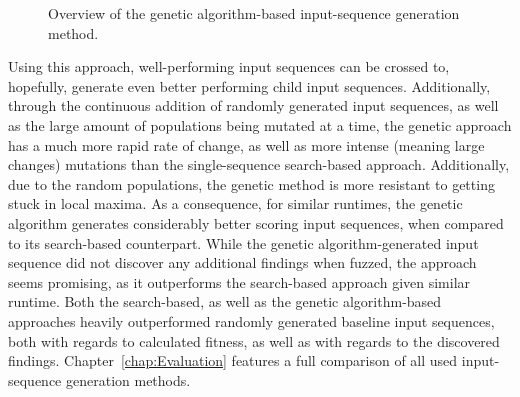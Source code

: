 \begin{figure}
	\begin{centering}
\caption{Overview of the genetic algorithm-based input-sequence generation method.}
\label{fig:fuzz_genetic}
\end{centering}
\end{figure}

Using this approach, well-performing input sequences can be crossed to, hopefully, generate even better performing child input sequences. Additionally, through the continuous addition of randomly generated input sequences, as well as the large amount of populations being mutated at a time, the genetic approach has a much more rapid rate of change, as well as more intense (meaning large changes) mutations than the single-sequence search-based approach. Additionally, due to the random populations, the genetic method is more resistant to getting stuck in local maxima. As a consequence, for similar runtimes, the genetic algorithm generates considerably better scoring input sequences, when compared to its search-based counterpart. While the genetic algorithm-generated input sequence did not discover any additional findings when fuzzed, the approach seems promising, as it outperforms the search-based approach given similar runtime. Both the search-based, as well as the genetic algorithm-based approaches heavily outperformed randomly generated baseline input sequences, both with regards to calculated fitness, as well as with regards to the discovered findings. Chapter~\ref{chap:Evaluation} features a full comparison of all used input-sequence generation methods.